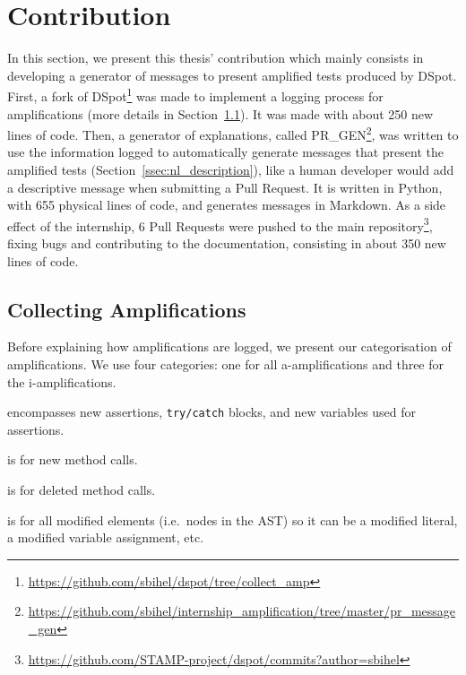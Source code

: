 \documentclass[a4paper,11pt]{sdm_internship}
\newcommand{\dspot}{DSpot\xspace}
\newcommand{\prgen}{PR\_GEN\xspace}
\theoremstyle{definition}
\begin{document}
\section{Contribution}%
\label{sec:contribution}

In this section, we present this thesis' contribution which mainly consists in developing a generator of messages to present amplified tests produced by \dspot{}.
First, a fork of DSpot\footnote{\url{https://github.com/sbihel/dspot/tree/collect_amp}} was made to implement a logging process for amplifications (more details in Section~\ref{ssec:retrieve_amplifications}).
It was made with about 250 new lines of code.
Then, a generator of explanations, called \prgen{}\footnote{\url{https://github.com/sbihel/internship_amplification/tree/master/pr_message_gen}}, was written to use the information logged to automatically generate messages that present the amplified tests (Section~\ref{ssec:nl_description}), like a human developer would add a descriptive message when submitting a Pull Request.
It is written in Python, with 655 physical lines of code, and generates messages in Markdown.
As a side effect of the internship, 6 Pull Requests were pushed to the main repository\footnote{\url{https://github.com/STAMP-project/dspot/commits?author=sbihel}}, fixing bugs and contributing to the documentation, consisting in about 350 new lines of code.

\subsection{Collecting Amplifications}%
\label{ssec:retrieve_amplifications}
Before explaining how amplifications are logged, we present our categorisation of amplifications.
We use four categories: one for all a-amplifications and three for the i-amplifications.
\begin{description}[itemindent=0em,labelwidth=5em,leftmargin=5em,align=right]
  \item[\texttt{ASSERT}] encompasses new assertions, \texttt{try/catch} blocks, and new variables used for assertions.
  \item[\texttt{ADD}] is for new method calls.
  \item[\texttt{DEL}] is for deleted method calls.
  \item[\texttt{MODIFY}] is for all modified elements (i.e.\ nodes in the AST) so it can be a modified literal, a modified variable assignment, etc.
\end{description}
\end{document}
